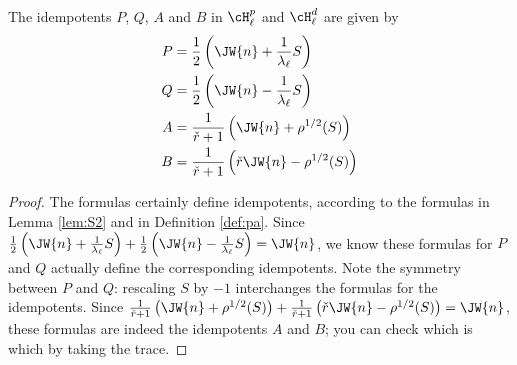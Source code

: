 \begin{lem}
\label{lem:idempotents1}
The idempotents $P$, $Q$, $A$ and $B$ in $\cH_\ell^p$ and $\cH_\ell^d$ are given by 
\begin{align}
P & = \frac{1}{2}\left(\JW{n} + \frac{1}{\lambda_\ell}S\right) \label{eq:P} \\
Q & = \frac{1}{2}\left(\JW{n} - \frac{1}{\lambda_\ell}S\right) \label{eq:Q} \\
A & = \frac{1}{\check{r}+1}\left(\JW{n}  + \rho^{1/2}(S)\right) \label{eq:A} \\
B & = \frac{1}{\check{r}+1}\left(\check{r} \JW{n} - \rho^{1/2}(S)\right) \label{eq:B}
\end{align}
\end{lem}
\begin{proof}
The formulas certainly define idempotents, according to the formulas in Lemma \ref{lem:S2} and in Definition \ref{def:pa}. Since $\frac{1}{2}\left(\JW{n} + \frac{1}{\lambda_\ell}S\right)+\frac{1}{2}\left(\JW{n} - \frac{1}{\lambda_\ell}S\right) = \JW{n}$, we know these formulas for $P$ and $Q$ actually define the corresponding idempotents. Note the symmetry between $P$ and $Q$: rescaling $S$ by $-1$ interchanges the formulas for the idempotents.
Since $\frac{1}{\check{r}+1}\left(\JW{n}  + \rho^{1/2}(S)\right) + \frac{1}{\check{r}+1}\left(\check{r} \JW{n} - \rho^{1/2}(S)\right) = \JW{n}$, these formulas are indeed the idempotents $A$ and $B$; you can check which is which by taking the trace.
\end{proof}

